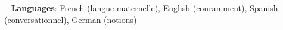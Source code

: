\documentclass[letterpaper,11pt]{article}
\begin{document}
\sffamily








\vspace{-14pt}
\faGlobe ~ \textbf{Languages}{: French (langue maternelle), English (couramment), Spanish (conversationnel), German (notions)} \\
\end{document}
